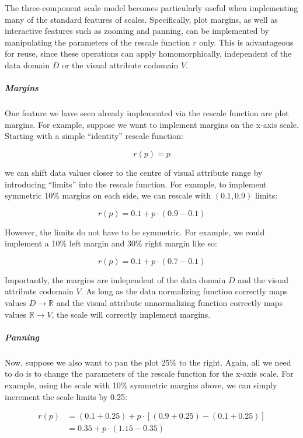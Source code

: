 \documentclass[
]{book}
\theoremstyle{definition}
\theoremstyle{definition}
\theoremstyle{definition}
\theoremstyle{definition}
\theoremstyle{remark}
\begin{document}
The three-component scale model becomes particularly useful when implementing many of the standard features of scales. Specifically, plot margins, as well as interactive features such as zooming and panning, can be implemented by manipulating the parameters of the rescale function \(r\) only. This is advantageous for reuse, since these operations can apply homomorphically, independent of the data domain \(D\) or the visual attribute codomain \(V\).

\subparagraph{Margins}\label{margins}

One feature we have seen already implemented via the rescale function are plot margins. For example, suppose we want to implement margins on the x-axis scale. Starting with a simple ``identity'' rescale function:

\[r(p) = p\]

we can shift data values closer to the centre of visual attribute range by introducing ``limits'' into the rescale function. For example, to implement symmetric 10\% margins on each side, we can rescale with \((0.1, 0.9)\) limits:

\[r(p) = 0.1 + p \cdot (0.9 - 0.1)\]

However, the limits do not have to be symmetric. For example, we could implement a 10\% left margin and 30\% right margin like so:

\[r(p) = 0.1 + p \cdot (0.7 - 0.1)\]

Importantly, the margins are independent of the data domain \(D\) and the visual attribute codomain \(V\). As long as the data normalizing function correctly maps values \(D \to \mathbb{R}\) and the visual attribute unnormalizing function correctly maps values \(\mathbb{R} \to V\), the scale will correctly implement margins.

\subparagraph{Panning}\label{panning}

Now, suppose we also want to pan the plot 25\% to the right. Again, all we need to do is to change the parameters of the rescale function for the x-axis scale. For example, using the scale with 10\% symmetric margins above, we can simply increment the scale limits by 0.25:

\begin{align}

r(p) &= (0.1 + 0.25) + p \cdot [(0.9 + 0.25) - (0.1 + 0.25)] \\
    &= 0.35 + p \cdot (1.15 - 0.35)

\end{align}
\end{document}
